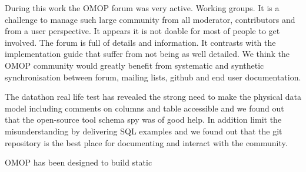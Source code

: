 During this work the OMOP forum was very active. Working groups.  It is a
challenge to manage such large community from all moderator, contributors and
from a user perspective. It appears it is not doable for most of people to get
involved. The forum is full of details and information. It contrasts with the
implementation guide that suffer from not being as well detailed. We think the
OMOP community would greatly benefit from systematic and synthetic
synchronisation between forum, mailing lists,  github and end user
documentation.

The datathon real life test has revealed the strong need to make the physical
data model including comments on columns and table accessible and we found out
that the open-source tool schema spy was of good help. In addition limit the
misunderstanding by delivering SQL examples and we found out that the git
repository is the best place for documenting and interact with the community.

OMOP has been designed to build static
